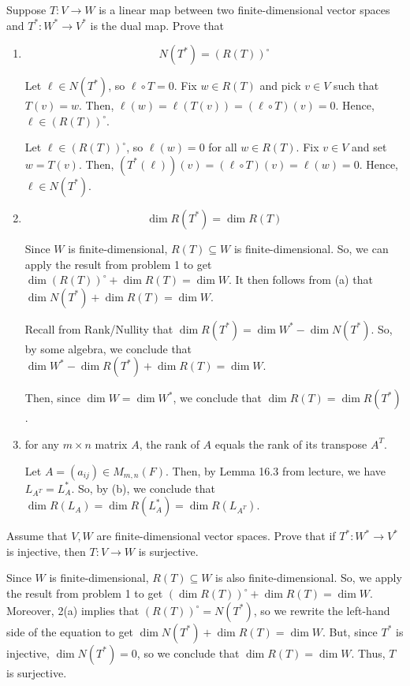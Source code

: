 \documentclass{article}
\begin{document}
\begin{problem}
Suppose $T : V \to W$ is a linear map between two finite-dimensional vector spaces and $T^* : W^* \to V^*$ is the dual map.
Prove that
\begin{enumerate}[label=\bfalph]
	\item \[N(T^*) = (R(T))^\circ\]
	      \begin{solution}
		      Let $\ell \in N(T^*)$, so $\ell \circ T = 0$.
		      Fix $w \in R(T)$ and pick $v \in V$ such that $T(v) = w$.
		      Then, $\ell(w) = \ell(T(v)) = (\ell \circ T)(v) = 0$.
		      Hence, $\ell \in (R(T))^\circ$.

		      Let $\ell \in (R(T))^\circ$, so $\ell(w) = 0$ for all $w \in R(T)$.
		      Fix $v \in V$ and set $w = T(v)$.
		      Then, $(T^*(\ell))(v) = (\ell \circ T)(v) = \ell(w) = 0$.
		      Hence, $\ell \in N(T^*)$.
	      \end{solution}

	\item \[\dim R(T^*) = \dim R(T)\]
	      \begin{solution}
		      Since $W$ is finite-dimensional, $R(T) \subseteq W$ is finite-dimensional.
		      So, we can apply the result from problem 1 to get $\dim (R(T))^\circ + \dim R(T) = \dim W$.
		      It then follows from (a) that $\dim N(T^*) + \dim R(T) = \dim W$.

		      Recall from Rank/Nullity that $\dim R(T^*) = \dim W^* - \dim N(T^*)$.
		      So, by some algebra, we conclude that $\dim W^* - \dim R(T^*) + \dim R(T) = \dim W$.

		      Then, since $\dim W = \dim W^*$, we conclude that $\dim R(T) = \dim R(T^*)$.
	      \end{solution}

	\item for any $m \times n$ matrix $A$, the rank of $A$ equals the rank of its transpose $A^T$.
	      \begin{solution}
		      Let $A = (a_{ij}) \in M_{m, n}(F)$.
		      Then, by Lemma 16.3 from lecture, we have $L_{A^T} = L_A^*$.
		      So, by (b), we conclude that $\dim R(L_A) = \dim R(L_A^*) = \dim R(L_{A^T})$.
	      \end{solution}
\end{enumerate}
\end{problem}

\newpage

\begin{problem}
Assume that $V, W$ are finite-dimensional vector spaces.
Prove that if $T^* : W^* \to V^*$ is injective, then $T: V \to W$ is surjective.
\end{problem}
\begin{solution}
	Since $W$ is finite-dimensional, $R(T) \subseteq W$ is also finite-dimensional.
	So, we apply the result from problem 1 to get $(\dim R(T))^\circ + \dim R(T) = \dim W$.
	Moreover, 2(a) implies that $(R(T))^\circ = N(T^*)$, so we rewrite the left-hand side of the equation to get
	$\dim N(T^*) + \dim R(T) = \dim W$.
	But, since $T^*$ is injective, $\dim N(T^*) = 0$, so we conclude that $\dim R(T) = \dim W$.
	Thus, $T$ is surjective.
\end{solution}
\end{document}
